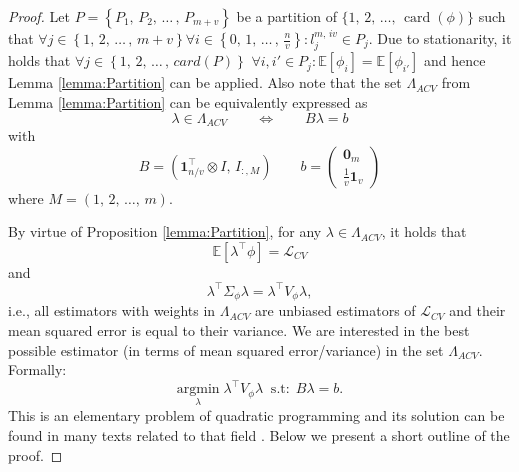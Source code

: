 \documentclass[11pt,dvipsnames]{article}
\newtheorem{proof}{Proof of Proposition}
\DeclareMathOperator{\cardt}{card}
\begin{document}
\begin{appendices}
\begin{proof}
Let $ P=\left\lbrace P_{1},\, P_{2},\, \dots\,,\,P_{m+v} \right\rbrace  $ be a partition of $ \lbrace 1,\,2,\,\ldots,\,\cardt(\phi)\rbrace $ such that $ \forall j \in  \left\lbrace 1,\, 2,\, \dots\,,\,m+v \right\rbrace \forall i \in  \left\lbrace 0,\, 1,\, \dots\,,\,\frac{n}{v} \right\rbrace: l_{j}^{m,\,iv } \in P_{j}  $. Due to stationarity, it holds that $ \forall j \in \left\lbrace 1,\, 2,\, \dots\,,\,card(P) \right\rbrace $  $ \forall i,i' \in P_{j}: \mathbb{E}[\phi_{i}]=\mathbb{E}[\phi_{i'}] $ and hence Lemma \ref{lemma:Partition} can be applied. Also note that the set $ \Lambda_{ACV} $ from Lemma \ref{lemma:Partition} can be equivalently expressed as 
\begin{equation}
\lambda \in \Lambda_{ACV}  \qquad \iff \qquad B\lambda=b
\end{equation}
with
\begin{equation}
B=\left(  \mathbf{1}_{n/v}^{\top}\otimes I,\,I_{:,M} \right) \qquad b=
\begin{pmatrix}
\mathbf{0}_{m}\\
\frac{1}{v}\mathbf{1}_{v}
\end{pmatrix}
\end{equation}
where $ M=\left(1,\,2,\,\ldots,\,m \right)  $.

By virtue of Proposition \ref{lemma:Partition}, for any $ \lambda \in \Lambda_{ACV} $, it holds that 
\begin{equation}
\mathbb{E}[\lambda^{\top}\phi]=\mathcal{L}_{CV} 
\end{equation}
and
\begin{equation}
\lambda^{\top} \Sigma_{\phi} \lambda= \lambda^{\top} V_{\phi} \lambda,
\end{equation}
i.e., all estimators with weights in $ \Lambda_{ACV} $ are unbiased estimators of $ \mathcal{L}_{CV}  $ and their mean squared error is equal to their variance. We are interested in the best possible estimator (in terms of mean squared error/variance) in the set $ \Lambda_{ACV} $. Formally:
\begin{equation}\label{eq:QPObjective} 
\underset{\lambda}{\mathrm{argmin}} \; \lambda^{\top} V_{\phi} \lambda \;\; \mathrm{s.t:}\; B\lambda=b.
\end{equation}
This is an elementary problem of quadratic programming and its solution can be found in many texts related to that field \citep[see e.g.][p: 53]{johnsonStatisticalSignalProcessing2020}. Below we present a short outline of the proof.


\end{proof}
\end{appendices}
\end{document}
